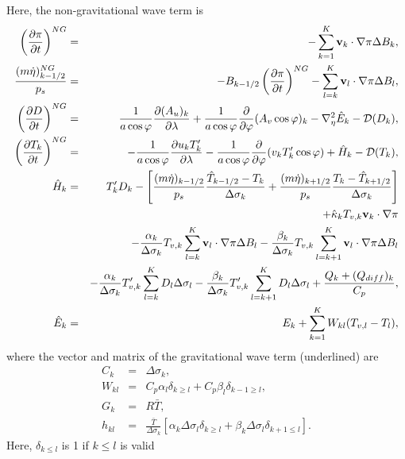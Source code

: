 Here, the non-gravitational wave term is \begin{eqnarray}
  \left( \frac{\partial \pi}{\partial t} \right)^{NG}
   &=&   - \sum_{k=1}^{K} {\mathbf{v}}_{k} \cdot \nabla \pi
       \Delta B_{k}, \\
  \frac{(m\dot{\eta})^{NG}_{k-1/2}}{p_s}
 &=& - B_{k-1/2} \left( \frac{\partial \pi}{\partial t} \right)^{NG}
   - \sum_{l=k}^{K} {\mathbf{v}}_{l} \cdot \nabla \pi
       \Delta B_{l}, \\
  \left( \frac{\partial D}{\partial t} \right)^{NG}
       &=&   \frac{1}{a\cos\varphi}
            \frac{\partial (A_u)_{k}}{\partial \lambda}
          + \frac{1}{a\cos\varphi}
            \frac{\partial }{\partial \varphi} (A_v \cos\varphi)_k
          - \nabla^{2}_{\eta} \hat{E}_{k}
          - {\mathcal D}(D_{k}), \\
  \left( \frac{\partial T_{k}}{\partial t} \right)^{NG}
      &=&   - \frac{1}{a\cos\varphi}
               \frac{\partial u_k T'_k}{\partial \lambda}
          - \frac{1}{a\cos\varphi}
               \frac{\partial }{\partial \varphi} (v_k T'_k \cos\varphi)
          + \hat{H}_{k}
          - {\mathcal D}(T_{k}), \\
 \hat{H}_k  &=&  T_{k}^{\prime} D_{k} - \left[   \frac{(m\dot{\eta})_{k-1/2}}{p_s} \frac{\hat{T}_{k-1/2} - T_k}{\Delta\sigma_k}
               + \frac{(m\dot{\eta})_{k+1/2}}{p_s} \frac{T_k - \hat{T}_{k+1/2}}{\Delta\sigma_k} \right] \notag\\
         &&+ \hat{\kappa}_{k} T_{v,k} {\mathbf{v}}_{k} \cdot \nabla \pi \notag\\
         &&- \frac{\alpha_{k}}{\Delta \sigma_{k} } T_{v,k}
             \sum_{l=k}^{K} {\mathbf{v}}_{l} \cdot \nabla \pi
               \Delta B_{l}
           - \frac{\beta_{k}}{\Delta \sigma_{k} } T_{v,k}
             \sum_{l=k+1}^{K} {\mathbf{v}}_{l} \cdot \nabla \pi
               \Delta B_{l} \notag\\
        &&- \frac{\alpha_{k}}{\Delta \sigma_{k} } T'_{v,k}
             \sum_{l=k}^{K} D_l  \Delta \sigma_{l}
           - \frac{\beta_{k}}{\Delta \sigma_{k} } T'_{v,k}
             \sum_{l=k+1}^{K} D_l  \Delta \sigma_{l}
         + \frac{Q_k + (Q_{diff})_k}{C_p}, \\
  \hat{E}_k &=& E_{k}
            + \sum_{k=1}^{K} W_{kl} ( T_{v,l}-T_{l} ),   \end{eqnarray} where the vector and matrix of the gravitational wave term (underlined) are \begin{eqnarray}
  C_{k} &=& \Delta \sigma_{k}, \\
  W_{kl} &=& C_{p} \alpha_{l} \delta_{k \geq l}
         + C_{p} \beta_{l} \delta_{k-1 \geq l}, \\
  G_{k} &=& R\bar{T}, \\
h_{kl} &=& \frac{\bar{T}}{\Delta\sigma_k}\left[\alpha_k \Delta\sigma_l \delta_{k\ge l}+\beta_k \Delta\sigma_l \delta_{k+1\le l}\right].   \end{eqnarray} Here, \(\delta_{k \leq l}\) is 1 if \(k \leq l\) is valid
